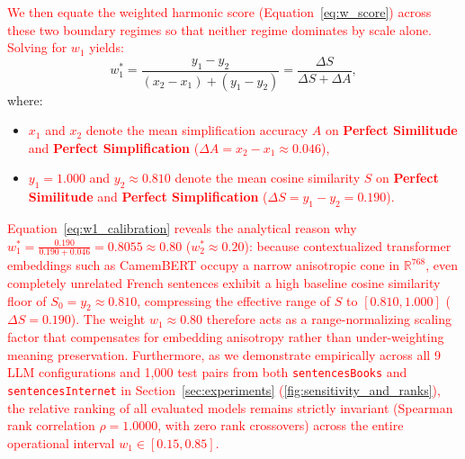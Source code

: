 \textcolor{red}{We then equate the weighted harmonic score (Equation~\ref{eq:w_score}) across these two boundary regimes so that neither regime dominates by scale alone. Solving for $w_1$ yields:}
{\color{red}\begin{equation}
    w_1^* = \frac{y_1 - y_2}{(x_2 - x_1) + (y_1 - y_2)} = \frac{\Delta S}{\Delta S + \Delta A},
    \label{eq:w1_calibration}
\end{equation}}
where:
\begin{itemize}
    \item \textcolor{red}{$x_1$ and $x_2$ denote the mean simplification accuracy $A$ on \textbf{Perfect Similitude} and \textbf{Perfect Simplification} ($\Delta A = x_2 - x_1 \approx 0.046$),}
    \item \textcolor{red}{$y_1 = 1.000$ and $y_2 \approx 0.810$ denote the mean cosine similarity $S$ on \textbf{Perfect Similitude} and \textbf{Perfect Simplification} ($\Delta S = y_1 - y_2 = 0.190$).}
\end{itemize}

\textcolor{red}{Equation~\ref{eq:w1_calibration} reveals the analytical reason why $w_1^* = \frac{0.190}{0.190 + 0.046} = 0.8055 \approx 0.80$ ($w_2^* \approx 0.20$): because contextualized transformer embeddings such as CamemBERT occupy a narrow anisotropic cone in $\mathbb{R}^{768}$, even completely unrelated French sentences exhibit a high baseline cosine similarity floor of $S_0 = y_2 \approx 0.810$, compressing the effective range of $S$ to $[0.810, 1.000]$ ($\Delta S = 0.190$). The weight $w_1 \approx 0.80$ therefore acts as a range-normalizing scaling factor that compensates for embedding anisotropy rather than under-weighting meaning preservation. Furthermore, as we demonstrate empirically across all 9 LLM configurations and 1,000 test pairs from both \texttt{sentencesBooks} and \texttt{sentencesInternet} in Section~\ref{sec:experiments} (\autoref{fig:sensitivity_and_ranks}), the relative ranking of all evaluated models remains strictly invariant (Spearman rank correlation $\rho = 1.0000$, with zero rank crossovers) across the entire operational interval $w_1 \in [0.15, 0.85]$.}

